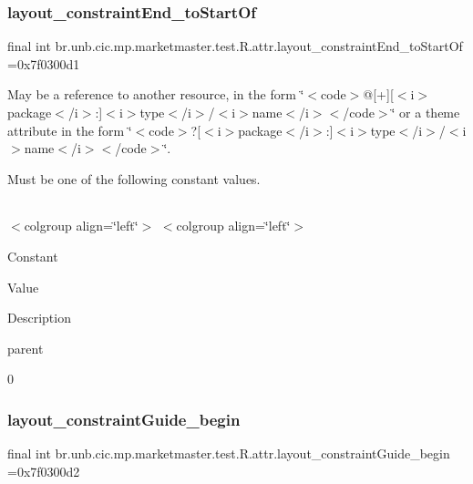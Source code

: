 \subsubsection{\texorpdfstring{layout\+\_\+constraint\+End\+\_\+to\+Start\+Of}{layout\_constraintEnd\_toStartOf}}
{\footnotesize\ttfamily final int br.\+unb.\+cic.\+mp.\+marketmaster.\+test.\+R.\+attr.\+layout\+\_\+constraint\+End\+\_\+to\+Start\+Of =0x7f0300d1\hspace{0.3cm}{\ttfamily [static]}}

May be a reference to another resource, in the form \char`\"{}$<$code$>$@\mbox{[}+\mbox{]}\mbox{[}$<$i$>$package$<$/i$>$\+:\mbox{]}$<$i$>$type$<$/i$>$/$<$i$>$name$<$/i$>$$<$/code$>$\char`\"{} or a theme attribute in the form \char`\"{}$<$code$>$?\mbox{[}$<$i$>$package$<$/i$>$\+:\mbox{]}$<$i$>$type$<$/i$>$/$<$i$>$name$<$/i$>$$<$/code$>$\char`\"{}. 

Must be one of the following constant values.

\tabulinesep=1mm
\begin{longtabu} spread 0pt [c]{*{0}{|X[-1]}|}
\hline
\end{longtabu}
$<$colgroup align=\char`\"{}left\char`\"{}$>$ $<$colgroup align=\char`\"{}left\char`\"{}$>$ 

Constant

Value

Description 

parent

0\mbox{\label{classbr_1_1unb_1_1cic_1_1mp_1_1marketmaster_1_1test_1_1R_1_1attr_a7e275e9f067bf9606cbb50790b7951e7}} 
\subsubsection{\texorpdfstring{layout\+\_\+constraint\+Guide\+\_\+begin}{layout\_constraintGuide\_begin}}
{\footnotesize\ttfamily final int br.\+unb.\+cic.\+mp.\+marketmaster.\+test.\+R.\+attr.\+layout\+\_\+constraint\+Guide\+\_\+begin =0x7f0300d2\hspace{0.3cm}{\ttfamily [static]}}


